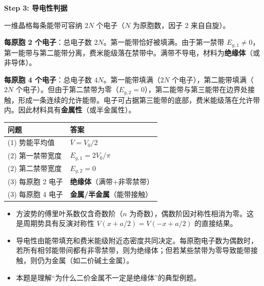 \begin{derivationbox}[标准解题过程]
\textbf{Step 3: 导电性判据}

一维晶格每条能带可容纳 $2N$ 个电子（$N$ 为原胞数，因子 2 来自自旋）。

\textbf{每原胞 2 个电子}：总电子数 $2N$。第一能带恰好被填满。由于第一禁带 $E_{g,1}\neq0$，第一能带与第二能带分离，费米能级落在禁带中。满带不导电，材料为\textbf{绝缘体}（或非导体）。

\textbf{每原胞 4 个电子}：总电子数 $4N$。第一能带填满（$2N$ 个电子），第二能带填满（$2N$ 个电子）。但由于第二禁带为零（$E_{g,2}=0$），第二能带与第三能带在边界处接触，形成一条连续的允许能带。电子可占据第三能带的底部，费米能级落在允许带内。因此材料具有\textbf{金属性}（或半金属性）。
\end{derivationbox}

\begin{formulabox}[答案汇总]
\begin{center}
\begin{tabular}{ll}
\toprule
\textbf{问题} & \textbf{答案} \\
\midrule
(1) 势能平均值 & $\bar{V}=V_0/2$ \\
(2) 第一禁带宽度 & $E_{g,1}=2V_0/\pi$ \\
(2) 第二禁带宽度 & $E_{g,2}=0$ \\
(3) 每原胞 2 电子 & \textbf{绝缘体}（满带+非零禁带） \\
(3) 每原胞 4 电子 & \textbf{金属/半金属}（能带接触） \\
\bottomrule
\end{tabular}
\end{center}
\end{formulabox}

\begin{insightbox}[物理图像]
\begin{itemize}
    \item 方波势的傅里叶系数仅含奇数阶（$n$ 为奇数），偶数阶因对称性相消为零。这是周期势具有反演对称性 $V(x+a/2)=V(-x+a/2)$ 的直接结果。
    \item 导电性由能带填充和费米能级附近态密度共同决定。每原胞电子数为偶数时，若所有相邻能带间都有非零禁带，则为绝缘体；但若某些禁带为零导致能带接触，则仍为金属（如二价碱土金属）。
    \item 本题是理解``为什么二价金属不一定是绝缘体''的典型例题。
\end{itemize}
\end{insightbox}
